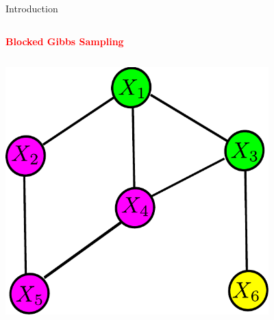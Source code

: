 \documentclass[serif,mathserif,final]{beamer}
\newcommand{\itemlinespace}{0.3in}
\newcommand{\paralinespace}{0.6in}
\newcommand{\insertlinespace}{\vspace{\itemlinespace}}
\newcommand{\insertparaspace}{\vspace{\paralinespace}}
\newcommand{\semititle}[1]{\textcolor{red}{\Huge \textbf{#1}}}
\begin{document}
\begin{frame}{}
\begin{columns}[t]
\begin{column}{0.49\linewidth}
\begin{block}{\Huge Introduction}
{\begin{columns}
          \end{columns}
        

        \insertparaspace
        \semititle{Blocked Gibbs Sampling} \\
        \vspace{\itemlinespace}
        \begin{columns}

        \begin{column}{5in}
          \includegraphics[width=4in]{figs/blocked_gibbs}
        \end{column}


\end{columns}}
\end{block}
\end{column}
\end{columns}
\end{frame}
\end{document}
